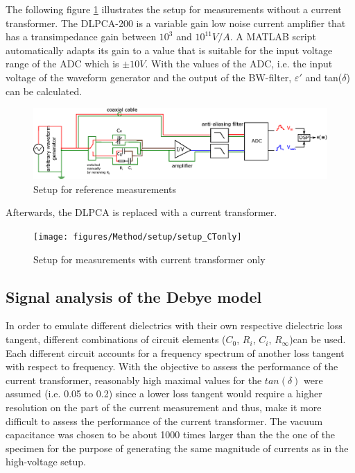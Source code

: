 The following figure \ref{sec.setup_amplifier} illustrates the setup for measurements without a current transformer. The DLPCA-200 is a variable gain low noise current amplifier that has a transimpedance gain between $10^3$ and $10^{11} V/A$. A MATLAB script automatically adapts its gain to a value that is suitable for the input voltage range of the ADC which is $\pm 10V$. With the values of the ADC, i.e. the input voltage of the waveform generator and the output of the BW-filter, $\varepsilon'$ and tan($\delta$) can be calculated. 

\begin{figure}[htbp]
	\centering
	\includegraphics[width=\textwidth]{figures/Method/setup/setup_DLPCA.eps}		
	\caption[Kurze Abbildungsbeschreibung]{Setup for reference measurements \protect\footnotemark} 
	
	\label{sec.setup_amplifier}

\end{figure}


Afterwards, the DLPCA is replaced with a current transformer. 
\begin{figure}[htbp]
	\centering
	\texttt{[image: figures/Method/setup/setup\_CTonly]}		
	\caption[Kurze Abbildungsbeschreibung]{Setup for measurements with current transformer only \protect\footnotemark}
	\label{sec.setup}

\end{figure}

\subsection{Signal analysis of the Debye model}

In order to emulate different dielectrics with their own respective dielectric loss tangent, different combinations of circuit elements ($C_0$, $R_i$, $C_i$, $R_{\infty}$)can be used.
Each different circuit accounts for a frequency spectrum of another loss tangent with respect to frequency. With the objective to assess the performance of the current transformer, reasonably high maximal values for the $tan\left(\delta\right)$ were assumed (i.e. 0.05 to 0.2) since a lower loss tangent
would require a higher resolution on the part of the current measurement and thus, make it more difficult to assess the performance of the current transformer. The vacuum capacitance was chosen to be about 1000 times larger than
the the one of the specimen for the purpose of generating the same magnitude of currents as in the high-voltage setup.



